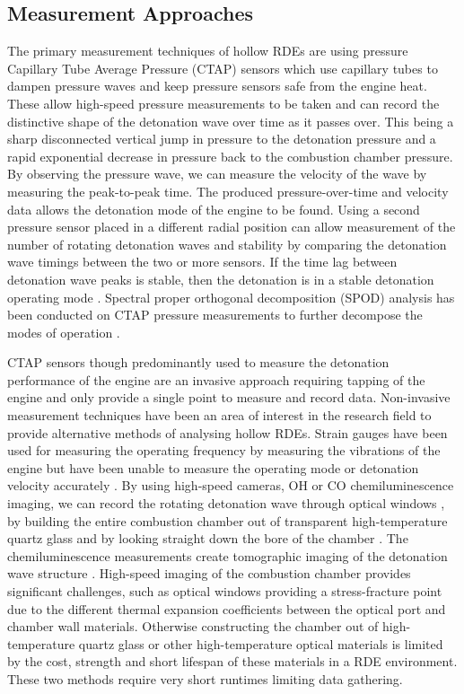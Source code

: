 \documentclass{article}
\begin{document}
\subsection{Measurement Approaches}

The primary measurement techniques of hollow RDEs are using pressure Capillary Tube Average Pressure (CTAP) sensors which use capillary tubes to dampen pressure waves and keep pressure sensors safe from the engine heat. These allow high-speed pressure measurements to be taken and can record the distinctive shape of the detonation wave over time as it passes over. This being a sharp disconnected vertical jump in pressure to the detonation pressure and a rapid exponential decrease in pressure back to the combustion chamber pressure. By observing the pressure wave, we can measure the velocity of the wave by measuring the peak-to-peak time. The produced pressure-over-time and velocity data allows the detonation mode of the engine to be found. Using a second pressure sensor placed in a different radial position can allow measurement of the number of rotating detonation waves and stability by comparing the detonation wave timings between the two or more sensors. If the time lag between detonation wave peaks is stable, then the detonation is in a stable detonation operating mode \cite{Betancourt2021}.  Spectral proper orthogonal decomposition (SPOD) analysis has been conducted on CTAP pressure measurements to further decompose the modes of operation \cite{Betancourt2021}.
\par

CTAP sensors though predominantly used to measure the detonation performance of the engine are an invasive approach requiring tapping of the engine and only provide a single point to measure and record data. Non-invasive measurement techniques have been an area of interest in the research field to provide alternative methods of analysing hollow RDEs. Strain gauges have been used for measuring the operating frequency by measuring the vibrations of the engine but have been unable to measure the operating mode or detonation velocity accurately \cite{Pritschau2022}. By using high-speed cameras, OH or CO chemiluminescence imaging, we can record the rotating detonation wave through optical windows \cite{Peng2020}, by building the entire combustion chamber out of transparent high-temperature quartz glass \cite{Wang2019} and by looking straight down the bore of the chamber \cite{Gaetano2022}. The chemiluminescence measurements create tomographic imaging of the detonation wave structure \cite{Gaetano2021}. High-speed imaging of the combustion chamber provides significant challenges, such as optical windows providing a stress-fracture point due to the different thermal expansion coefficients between the optical port and chamber wall materials. Otherwise constructing the chamber out of high-temperature quartz glass or other high-temperature optical materials is limited by the cost, strength and short lifespan of these materials in a RDE environment. These two methods require very short runtimes limiting data gathering.
\par
\end{document}
